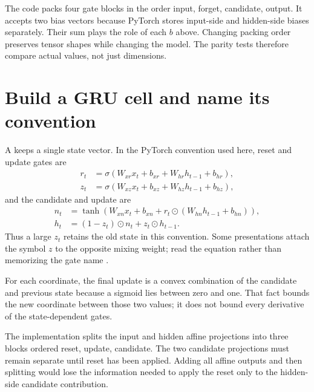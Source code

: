 The code packs four gate blocks in the order input, forget, candidate,
output. It accepts two bias vectors because PyTorch stores input-side and
hidden-side biases separately. Their sum plays the role of each $b$ above.
Changing packing order preserves tensor shapes while changing the model.
The parity tests therefore compare actual values, not just dimensions.

\section{Build a GRU cell and name its convention}

A  keeps a single state vector. In the
PyTorch convention used here, reset and update gates are
\begin{align}
r_t&=\sigma(W_{xr}x_t+b_{xr}+W_{hr}h_{t-1}+b_{hr}),\\
z_t&=\sigma(W_{xz}x_t+b_{xz}+W_{hz}h_{t-1}+b_{hz}),
\end{align}
and the candidate and update are
\begin{align}
n_t&=\tanh\left(W_{xn}x_t+b_{xn}
 +r_t\odot(W_{hn}h_{t-1}+b_{hn})\right),\\
h_t&=(1-z_t)\odot n_t+z_t\odot h_{t-1}.
\label{eq:gru}
\end{align}
Thus a large $z_t$ retains the old state in this convention.
Some presentations attach the symbol $z$ to the opposite mixing weight;
read the equation rather than memorizing the gate name \cite{gru-api}.


For each coordinate, the final update is a convex combination of the
candidate and previous state because a sigmoid lies between zero and one.
That fact bounds the new coordinate between those two values; it does not
bound every derivative of the state-dependent gates.


The implementation splits the input and hidden affine projections into
three blocks ordered reset, update, candidate. The two candidate projections
must remain separate until reset has been applied. Adding all affine
outputs and then splitting would lose the information needed to apply
the reset only to the hidden-side candidate contribution.

